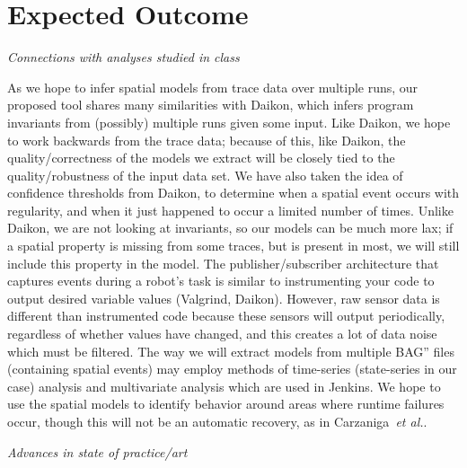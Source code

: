 \documentclass{article}
\newcommand\etal{\emph{et al.}}
\begin{document}


\section{Expected Outcome} 

\emph{Connections with analyses studied in class}

As we hope to infer spatial models from trace data over multiple runs, our proposed tool shares many similarities with Daikon, which infers program invariants from (possibly) multiple runs given some input.
Like Daikon, we hope to work backwards from the trace data; because of this, like Daikon, the quality/correctness of the models we extract will be closely tied to the quality/robustness of the input data set.
We have also taken the idea of confidence thresholds from Daikon, to determine when a spatial event occurs with regularity, and when it just happened to occur a limited number of times.
Unlike Daikon, we are not looking at invariants, so our models can be much more lax; if a spatial property is missing from some traces, but is present in most, we will still include this property in the model.
The publisher/subscriber architecture that captures events during a robot's task is similar to instrumenting your code to output desired variable values (Valgrind, Daikon).
However, raw sensor data is different than instrumented code because these sensors will output periodically, regardless of whether values have changed, and this creates a lot of data noise which must be filtered.
The way we will extract models from multiple BAG'' files (containing spatial events) may employ methods of time-series (state-series in our case) analysis and multivariate analysis which are used in Jenkins.  
We hope to use the spatial models to identify behavior around areas where runtime failures occur, though this will not be an automatic recovery, as in Carzaniga~\etal.

\emph{Advances in state of practice/art}



\end{document}
